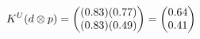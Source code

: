 \documentclass[preview]{standalone}
\begin{document}
\begin{align*}
\special{dvisvgm:raw <g id='unique000'>}K^U(d \otimes p) = \begin{pmatrix} (0.83)(0.77) \\ (0.83)(0.49) \end{pmatrix} = \begin{pmatrix} 0.64 \\ 0.41 \end{pmatrix}\special{dvisvgm:raw </g>}
\end{align*}
\end{document}

